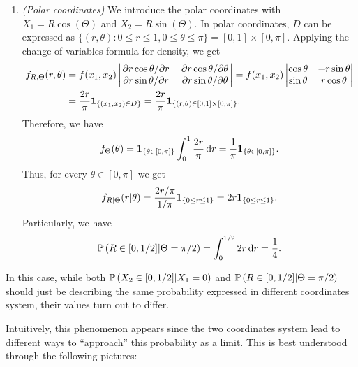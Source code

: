 \begin{enumerate}
\begin{enumerate}
\item \emph{(Polar coordinates)} We introduce the polar coordinates with
\(X_1=R\cos(\Theta)\) and \(X_2=R\sin(\Theta)\). In polar coordinates, \(D\)
can be expressed as \(\{(r,\theta):0\le r\le 1, 0\le \theta\le \pi\}
=[0,1]\times[0,\pi]\). Applying the change-of-variables formula for density,
we get
\begin{align*}
f_{R,\Theta}(r,\theta)&=f(x_{1},x_{2})
\begin{vmatrix}
\pdv{r\cos\theta}/{r}&\pdv{r\cos\theta}/{\theta} \\
\pdv{r\sin\theta}/{r}&\pdv{r\sin\theta}/{\theta}
\end{vmatrix}
=f(x_1,x_2)\begin{vmatrix}
\cos\theta&-r\sin\theta \\
\sin\theta&r\cos\theta
\end{vmatrix} \\
&=\frac{2r}{\pi}\mathbf{1}_{\left\{(x_1,x_2)\in D\right\}}
=\frac{2r}{\pi}\mathbf{1}_{\left\{(r,\theta)\in [0,1]\times [0,\pi]\right\}}.
\end{align*}
Therefore, we have \[f_{\Theta}(\theta)
=\indicset{\theta\in[0,\pi]}\int_{0}^{1}\frac{2r}{\pi}\odif{r}
=\frac{1}{\pi}\indicset{\theta\in[0,\pi]}.\]
Thus, for every \(\theta\in [0,\pi]\) we get
\[
f_{R|\Theta}(r|\theta)=\frac{2r/\pi}{1/\pi}\mathbf{1}_{\left\{0\le r\le 1\right\}}
=2r\mathbf{1}_{\left\{0\le r\le 1\right\}}.
\]
Particularly, we have
\[
\prob{R\in[0,1/2]|\Theta=\pi/2}=\int_{0}^{1/2}2r\odif{r}=\frac{1}{4}.
\]
\end{enumerate}
In this case, while both \(\mathbb{P}\left(X_2\in [0,1/2]|X_1=0\right)\) and
\(\mathbb{P}\left(R\in[0,1/2]|\Theta=\pi/2\right)\) should just be describing the same
probability expressed in different coordinates system, their values turn out to
differ.
\begin{center}
\end{center}
Intuitively, this phenomenon appears since the two coordinates system lead to
different ways to ``approach'' this probability as a limit. This is best
understood through the following pictures:
\begin{center}

\end{center}
\end{enumerate}
